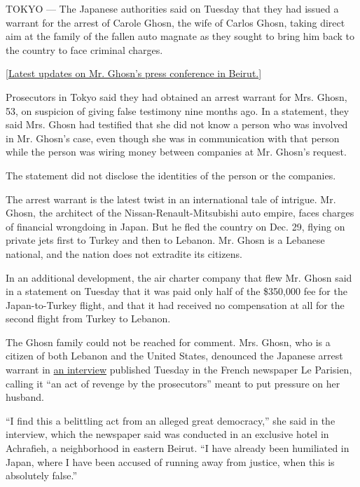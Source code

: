 TOKYO --- The Japanese authorities said on Tuesday that they had issued
a warrant for the arrest of Carole Ghosn, the wife of Carlos Ghosn,
taking direct aim at the family of the fallen auto magnate as they
sought to bring him back to the country to face criminal charges.

\href{https://www.nytimes.com/2020/01/08/business/carlos-ghosn-beirut.html}{{[}Latest
updates on Mr. Ghosn's press conference in Beirut.{]}}

Prosecutors in Tokyo said they had obtained an arrest warrant for Mrs.
Ghosn, 53, on suspicion of giving false testimony nine months ago. In a
statement, they said Mrs. Ghosn had testified that she did not know a
person who was involved in Mr. Ghosn's case, even though she was in
communication with that person while the person was wiring money between
companies at Mr. Ghosn's request.

The statement did not disclose the identities of the person or the
companies.

The arrest warrant is the latest twist in an international tale of
intrigue. Mr. Ghosn, the architect of the Nissan-Renault-Mitsubishi auto
empire, faces charges of financial wrongdoing in Japan. But he fled the
country on Dec. 29, flying on private jets first to Turkey and then to
Lebanon. Mr. Ghosn is a Lebanese national, and the nation does not
extradite its citizens.

In an additional development, the air charter company that flew Mr.
Ghosn said in a statement on Tuesday that it was paid only half of the
\$350,000 fee for the Japan-to-Turkey flight, and that it had received
no compensation at all for the second flight from Turkey to Lebanon.

The Ghosn family could not be reached for comment. Mrs. Ghosn, who is a
citizen of both Lebanon and the United States, denounced the Japanese
arrest warrant in
\href{http://www.leparisien.fr/economie/carole-ghosn-mon-mari-est-victime-d-un-complot-industriel-07-01-2020-8231064.php}{an
interview} published Tuesday in the French newspaper Le Parisien,
calling it ``an act of revenge by the prosecutors'' meant to put
pressure on her husband.

``I find this a belittling act from an alleged great democracy,'' she
said in the interview, which the newspaper said was conducted in an
exclusive hotel in Achrafieh, a neighborhood in eastern Beirut. ``I have
already been humiliated in Japan, where I have been accused of running
away from justice, when this is absolutely false.''

